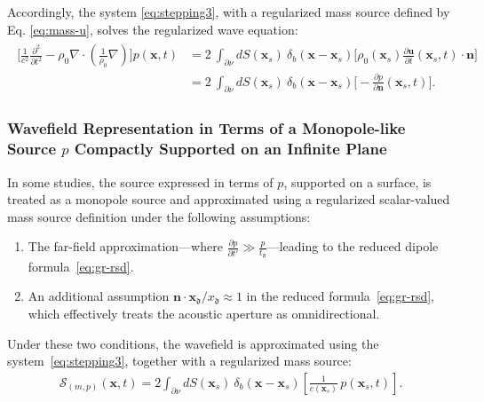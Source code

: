 \documentclass[11pt,reqno]{amsart}
\theoremstyle{remark}
\theoremstyle{italic_lemma}
\newcommand{\bx}{\boldsymbol{x}}
\newcommand{\bu}{\boldsymbol{u}}
\newcommand{\bn}{\boldsymbol{n}}
\newcommand{\fd}{\mathfrak{d}}
\begin{document}
Accordingly, the system \eqref{eq:stepping3}, with a regularized mass source defined by Eq. \eqref{eq:mass-u}, solves the regularized wave equation:
\begin{align}  \label{eq:wave-monopole}
\begin{split}
   \bigg[\frac{1}{c^2}\frac{\partial^2}{\partial t^2} - \rho_0 \nabla \cdot \left(\frac{1}{\rho_0} \nabla \right) \bigg] p(\bx, t)  & =  2 \  \int_{\partial \nu} dS(\bx_s) \  \delta_b(\bx-\bx_s)   \Big[ \rho_0(\bx_s)   \frac{\partial \bu}{\partial t} (\bx_s, t) \cdot \bn \Big]\\
   & = 2  \  \int_{\partial \nu} dS(\bx_s) \  \delta_b(\bx-\bx_s)   \Big[- \frac{\partial p}{ \partial  \bn}(\bx_s, t) \Big].
   \end{split}
\end{align}

\subsubsection{Wavefield Representation in Terms of a Monopole-like Source \( p \) Compactly Supported on an Infinite Plane} 
\label{sec:doublet}


In some studies, the source expressed in terms of \( p \), supported on a surface, is treated as a monopole source and approximated using a regularized scalar-valued mass source definition under the following assumptions:
\begin{enumerate}
    \item The far-field approximation—where \( \frac{\partial p}{\partial t'} \gg \frac{p}{t_{\fd}} \)—leading to the reduced dipole formula~\eqref{eq:gr-rsd}.
    \item An additional assumption \( \bn \cdot \bx_{\fd}/x_{\fd} \approx 1 \) in the reduced formula~\eqref{eq:gr-rsd}, which effectively treats the acoustic aperture as omnidirectional.
\end{enumerate}
Under these two conditions, the wavefield is approximated using the system~\eqref{eq:stepping3}, together with a regularized mass source:
\begin{align} \label{eq:mass-p2}
    \mathcal{S}_{(m,p)}(\bx, t)  
    = 2 \int_{\partial \nu} dS(\bx_s) \ \delta_b(\bx - \bx_s) \left[ \frac{1}{c(\bx_s)} \, p(\bx_s, t) \right].
\end{align}
\end{document}
